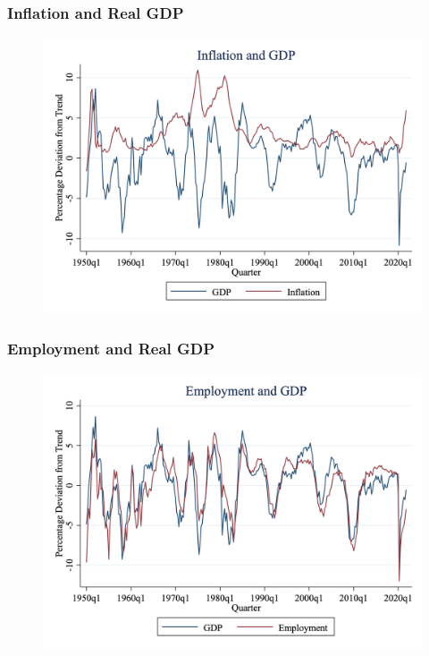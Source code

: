 \documentclass{beamer}
\begin{document}
\begin{frame}
\frametitle[alignment=center]{Inflation and Real GDP}
\begin{figure}
\centering
\includegraphics[scale=0.25]{Figures/Fig_3pt12.png}
\end{figure}
\end{frame}

\begin{frame}
\frametitle[alignment=center]{Employment and Real GDP}
\begin{figure}
\centering
\includegraphics[scale=0.25]{Figures/Fig_3pt13.png}
\end{figure}
\end{frame}
\end{document}
